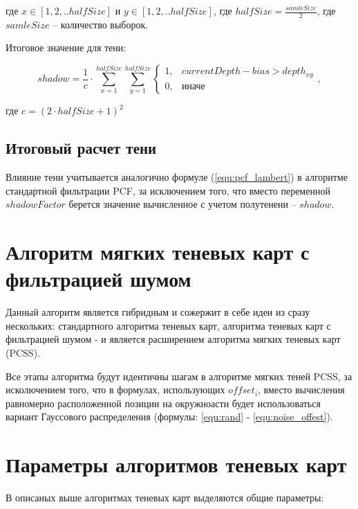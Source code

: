 \noindent где $x \in [1, 2, .. halfSize]$ и $y \in [1, 2, .. halfSize]$, где $halfSize = \frac{samleSize}{2}$,
где $samleSize$ -- количество выборок.

Итоговое значение для тени:

\begin{equation}
    \label{equ:pcf_pcss}
    shadow = \frac{1}{c} \cdot \sum_{x = 1}^{halfSize}\sum_{y = 1}^{halfSize}
    \begin{cases}
        1, & \text{$currentDepth - bias > depth_{xy}$} \\
        0, & \text{иначе}
    \end{cases},
\end{equation}

\noindent где $c = (2 \cdot halfSize + 1)^{2}$

\subsection*{Итоговый расчет тени}

Влияние тени учитывается аналогично формуле (\ref{equ:pcf_lambert}) в алгоритме
стандартной фильтрации PCF, за исключением того, что вместо переменной $shadowFactor$
берется значение вычисленное с учетом полутенени -- $shadow$.

\section{Алгоритм мягких теневых карт с фильтрацией шумом}

Данный алгоритм является гибридным и сожержит в себе идеи из
сразу нескольких: стандартного алгоритма теневых карт,
алгоритма теневых карт с фильтрацией шумом - и является
расширением алгоритма мягких теневых карт (PCSS).

Все этапы алгоритма будут идентичны шагам в алгоритме мягких
теней PCSS, за исколючением того, что в формулах, использующих
$offset_i$, вместо вычисления равномерно расположенной позиции на окружноасти
будет использоваться вариант Гауссового распределения (формулы: \ref{equ:rand} - \ref{equ:noise_offest}).

\section{Параметры алгоритмов теневых карт}

В описаных выше алгоритмах теневых карт выделяются общие параметры:

